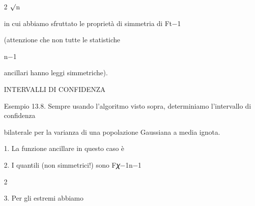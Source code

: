 \documentclass[a4paper,portrait,12pt]{article}
\begin{document}
\begin{flushleft}
2 $\surd$n
\end{flushleft}





\begin{flushleft}
in cui abbiamo sfruttato le propriet\`{a} di simmetria di Ft$-$1
\end{flushleft}


\begin{flushleft}
(attenzione che non tutte le statistiche
\end{flushleft}


\begin{flushleft}
n$-$1
\end{flushleft}


\begin{flushleft}
ancillari hanno leggi simmetriche).
\end{flushleft}










\begin{flushleft}
INTERVALLI DI CONFIDENZA
\end{flushleft}





\begin{flushleft}
Esempio 13.8. Sempre usando l'algoritmo visto sopra, determiniamo l'intervallo di confidenza
\end{flushleft}


\begin{flushleft}
bilaterale per la varianza di una popolazione Gaussiana a media ignota.
\end{flushleft}


\begin{flushleft}
1. La funzione ancillare in questo caso \`{e}
\end{flushleft}


\begin{flushleft}
2. I quantili (non simmetrici!) sono F𝜒$-$1n$-$1
\end{flushleft}


2


\begin{flushleft}
3. Per gli estremi abbiamo
\end{flushleft}
\end{document}
